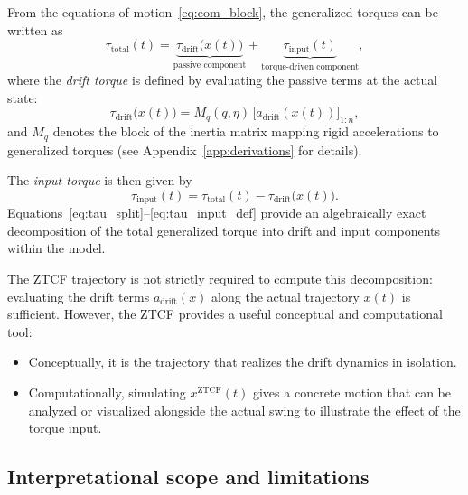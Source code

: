 \documentclass[12pt]{article}
\begin{document}
From the equations of motion~\eqref{eq:eom_block}, the generalized torques can be written as
\begin{equation}
  \tau_{\text{total}}(t)
  =
  \underbrace{\tau_{\text{drift}}\big(x(t)\big)}_{\text{passive component}}
  +
  \underbrace{\tau_{\text{input}}(t)}_{\text{torque-driven component}},
  \label{eq:tau_split}
\end{equation}
where the \emph{drift torque} is defined by evaluating the passive terms at the actual state:
\begin{equation}
  \tau_{\text{drift}}\big(x(t)\big)
  =
  M_{q}(q,\eta)\,\big[a_{\text{drift}}(x(t))\big]_{1:n},
\end{equation}
and \(M_{q}\) denotes the block of the inertia matrix mapping rigid accelerations to generalized torques (see Appendix~\ref{app:derivations} for details).

The \emph{input torque} is then given by
\begin{equation}
  \tau_{\text{input}}(t)
  =
  \tau_{\text{total}}(t) - \tau_{\text{drift}}\big(x(t)\big).
  \label{eq:tau_input_def}
\end{equation}
Equations~\eqref{eq:tau_split}--\eqref{eq:tau_input_def} provide an algebraically exact decomposition of the total generalized torque into drift and input components within the model.

The ZTCF trajectory is not strictly required to compute this decomposition: evaluating the drift terms \(a_{\text{drift}}(x)\) along the actual trajectory \(x(t)\) is sufficient. However, the ZTCF provides a useful conceptual and computational tool:
\begin{itemize}
  \item Conceptually, it is the trajectory that realizes the drift dynamics in isolation.
  \item Computationally, simulating \(x^{\mathrm{ZTCF}}(t)\) gives a concrete motion that can be analyzed or visualized alongside the actual swing to illustrate the effect of the torque input.
\end{itemize}

\subsection{Interpretational scope and limitations}
\end{document}

